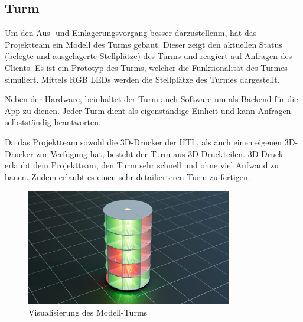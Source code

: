 \subsection{Turm}

Um den Aus- und Einlagerungsvorgang besser darzustellenm, hat das Projektteam ein Modell des Turms gebaut. Dieser zeigt den aktuellen Status (belegte und ausgelagerte Stellplätze) des Turms und reagiert auf Anfragen des Clients. Es ist ein Prototyp des Turms, welcher die Funktionalität des Turmes simuliert. Mittels RGB LEDs werden die Stellplätze des Turmes dargestellt.

\bigskip

\noindent Neben der Hardware, beinhaltet der Turm auch Software um als Backend für die App zu dienen. Jeder Turm dient als eigenständige Einheit und kann Anfragen selbstständig beantworten.

\bigskip

\noindent Da das Projektteam sowohl die 3D-Drucker der HTL, als auch einen eigenen 3D-Drucker zur Verfügung hat, besteht der Turm aus 3D-Druckteilen. 3D-Druck erlaubt dem Projektteam, den Turm sehr schnell und ohne viel Aufwand zu bauen. Zudem erlaubt es einen sehr detailierteren Turm zu fertigen.

\begin{figure}[H]
  \centering
  \includegraphics[width=0.8\textwidth]{images/turm_modell.png}
  \caption{Visualisierung des Modell-Turms}
  \label{fig:turm}
\end{figure}